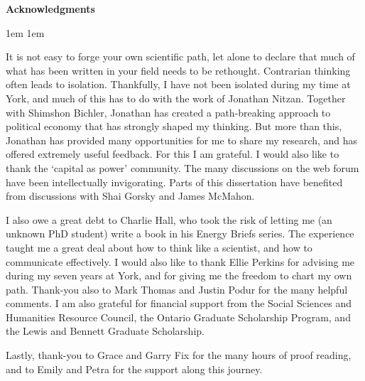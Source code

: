 
\newpage
{}
\vspace*{\fill}
{

	
	\begin{center}
		\textbf{Acknowledgments}	
	\end{center}
	
	\leftskip 1em
	\rightskip 1em
	
 It is not easy  to forge your own scientific path, let alone to declare that much of what has been written in your field   needs  to be rethought.   Contrarian thinking often leads to isolation.  Thankfully, I have not been isolated during my time at York, and much of this has to do with the work of Jonathan Nitzan. Together with Shimshon Bichler, Jonathan has created a path-breaking approach to political economy that has strongly shaped my thinking.  But more than this,   Jonathan has provided many opportunities for me to share my research, and has offered extremely useful feedback.  For this I am grateful.  I would also like to thank the `capital as power' community.  The many discussions on the web forum have been intellectually invigorating.  Parts of this dissertation have benefited from discussions with Shai Gorsky and James McMahon. 

I also owe a great debt to Charlie Hall, who took the risk of letting me (an unknown PhD student) write a book in his Energy Briefs series. The experience taught me a great deal about how to think like a scientist, and how to  communicate effectively. I would also like to thank Ellie Perkins for advising me during my seven years at York, and for giving me the freedom to chart my own path. Thank-you  also to Mark Thomas and Justin Podur for the many helpful comments.  I am also grateful for  financial support  from the Social Sciences and Humanities Resource Council, the Ontario Graduate Scholarship Program, and the Lewis and Bennett Graduate Scholarship.


Lastly, thank-you to Grace and Garry Fix for the many hours of proof reading, and to Emily and Petra for the support along this journey.


	
}
\vspace*{\fill}


